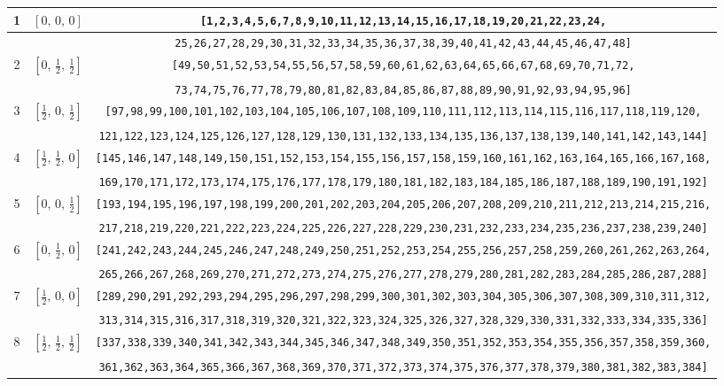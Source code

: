 \documentclass[fleqn,8pt]{jsarticle}
\begin{document}
\begin{longtable}{ccc}
1 & $\left[ 0,\, 0,\, 0 \right]$ & {\tt [1,2,3,4,5,6,7,8,9,10,11,12,13,14,15,16,17,18,19,20,21,22,23,24,} \\ \hline
 &  & {\tt 25,26,27,28,29,30,31,32,33,34,35,36,37,38,39,40,41,42,43,44,45,46,47,48]} \\ \hline
2 & $\left[ 0,\, \frac{1}{2},\, \frac{1}{2} \right]$ & {\tt [49,50,51,52,53,54,55,56,57,58,59,60,61,62,63,64,65,66,67,68,69,70,71,72,} \\ \hline
 &  & {\tt 73,74,75,76,77,78,79,80,81,82,83,84,85,86,87,88,89,90,91,92,93,94,95,96]} \\ \hline
3 & $\left[ \frac{1}{2},\, 0,\, \frac{1}{2} \right]$ & {\tt [97,98,99,100,101,102,103,104,105,106,107,108,109,110,111,112,113,114,115,116,117,118,119,120,} \\ \hline
 &  & {\tt 121,122,123,124,125,126,127,128,129,130,131,132,133,134,135,136,137,138,139,140,141,142,143,144]} \\ \hline
4 & $\left[ \frac{1}{2},\, \frac{1}{2},\, 0 \right]$ & {\tt [145,146,147,148,149,150,151,152,153,154,155,156,157,158,159,160,161,162,163,164,165,166,167,168,} \\ \hline
 &  & {\tt 169,170,171,172,173,174,175,176,177,178,179,180,181,182,183,184,185,186,187,188,189,190,191,192]} \\ \hline
5 & $\left[ 0,\, 0,\, \frac{1}{2} \right]$ & {\tt [193,194,195,196,197,198,199,200,201,202,203,204,205,206,207,208,209,210,211,212,213,214,215,216,} \\ \hline
 &  & {\tt 217,218,219,220,221,222,223,224,225,226,227,228,229,230,231,232,233,234,235,236,237,238,239,240]} \\ \hline
6 & $\left[ 0,\, \frac{1}{2},\, 0 \right]$ & {\tt [241,242,243,244,245,246,247,248,249,250,251,252,253,254,255,256,257,258,259,260,261,262,263,264,} \\ \hline
 &  & {\tt 265,266,267,268,269,270,271,272,273,274,275,276,277,278,279,280,281,282,283,284,285,286,287,288]} \\ \hline
7 & $\left[ \frac{1}{2},\, 0,\, 0 \right]$ & {\tt [289,290,291,292,293,294,295,296,297,298,299,300,301,302,303,304,305,306,307,308,309,310,311,312,} \\ \hline
 &  & {\tt 313,314,315,316,317,318,319,320,321,322,323,324,325,326,327,328,329,330,331,332,333,334,335,336]} \\ \hline
8 & $\left[ \frac{1}{2},\, \frac{1}{2},\, \frac{1}{2} \right]$ & {\tt [337,338,339,340,341,342,343,344,345,346,347,348,349,350,351,352,353,354,355,356,357,358,359,360,} \\ \hline
 &  & {\tt 361,362,363,364,365,366,367,368,369,370,371,372,373,374,375,376,377,378,379,380,381,382,383,384]} \\
\end{longtable}
\end{document}
